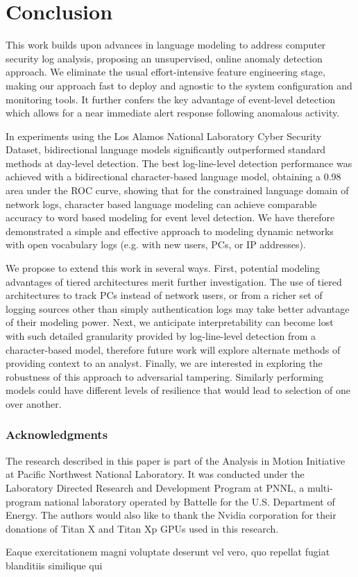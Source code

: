 \documentclass[letterpaper]{article} %
\begin{document}
\section{Conclusion}
This work builds upon advances in language modeling to address computer security log analysis, proposing an unsupervised, online anomaly detection approach. We eliminate the usual effort-intensive feature engineering stage, making our approach fast to deploy and agnostic to the system configuration and monitoring tools. It further confers the key advantage of event-level detection which allows for a near immediate alert response following anomalous activity.

In experiments using the Los Alamos National Laboratory Cyber Security Dataset, bidirectional language models significantly outperformed standard methods at day-level detection. The best log-line-level detection performance was achieved with a bidirectional character-based language model, obtaining a 0.98 area under the ROC curve,
showing  that for the constrained language domain of network logs, character based language modeling can achieve comparable accuracy to word based modeling for event level detection. We have therefore demonstrated a simple and effective approach to modeling dynamic networks with open vocabulary logs (e.g. with new users, PCs, or IP addresses).

We propose to extend this work in several ways.
First, potential modeling advantages of tiered architectures merit further investigation. The use of tiered architectures to track PCs instead of network users, or from a richer set of logging sources other than simply authentication logs may take better advantage of their modeling power.
Next, we anticipate interpretability can become lost with such detailed granularity provided by log-line-level detection from a character-based model, therefore future work will explore alternate methods of providing context to an analyst.
Finally, we are interested in exploring the robustness of this approach to adversarial tampering. Similarly performing models could have different levels of resilience that would lead to selection of one over another.

\subsubsection*{Acknowledgments}
The research described in this paper is part of the Analysis in Motion Initiative at Pacific Northwest National Laboratory. It was conducted under the Laboratory Directed Research and Development Program at PNNL, a multi-program national laboratory operated by Battelle for the U.S. Department of Energy.  The authors would also like to thank the Nvidia corporation for their donations of Titan X and Titan Xp GPUs used in this research.

Eaque exercitationem magni voluptate deserunt vel vero, quo repellat fugiat blanditiis similique qui


\end{document}
